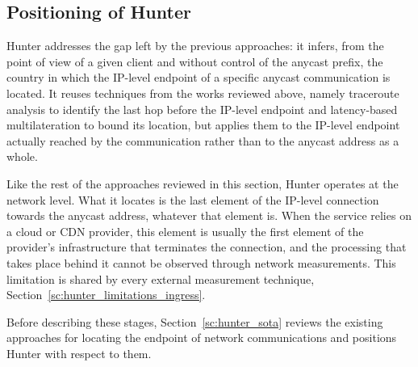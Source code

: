 \subsection{Positioning of Hunter}
\label{sc:hunter_sota_positioning}

Hunter addresses the gap left by the previous approaches: it infers, from the point of view of a given client and without control of the anycast prefix, the country in which the IP-level endpoint of a specific anycast communication is located. It reuses techniques from the works reviewed above, namely traceroute analysis to identify the last hop before the IP-level endpoint and latency-based multilateration to bound its location, but applies them to the IP-level endpoint actually reached by the communication rather than to the anycast address as a whole.

Like the rest of the approaches reviewed in this section, Hunter operates at the network level. What it locates is the last element of the IP-level connection towards the anycast address, whatever that element is. When the service relies on a cloud or CDN provider, this element is usually the first element of the provider's infrastructure that terminates the connection, and the processing that takes place behind it cannot be observed through network measurements. This limitation is shared by every external measurement technique, Section~\ref{sc:hunter_limitations_ingress}.

Before describing these stages, Section~\ref{sc:hunter_sota} reviews the existing approaches for locating the endpoint of network communications and positions Hunter with respect to them.


